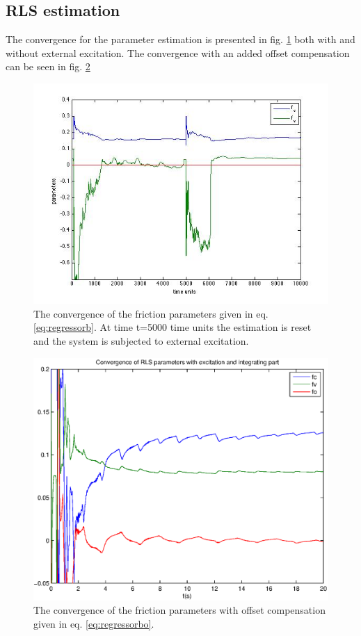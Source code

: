 \documentclass[10pt,a4paper]{article}
\begin{document}
\subsection{RLS estimation}
The convergence for the parameter estimation is presented in fig. \ref{fig:rlsconv} both with and without external excitation. The convergence with an added offset compensation can be seen in fig. \ref{fig:rlsconvoffset}
\begin{figure}[H]
\centering
\includegraphics[width=1\textwidth]{plots/rlsconvergence.jpg}
\caption{The convergence of the friction parameters given in eq. \ref{eq:regressorb}. At time t=5000 time units the estimation is reset and the system is subjected to external excitation.}
\label{fig:rlsconv}
\end{figure}
\begin{figure}[H]
\centering
\includegraphics[width=1\textwidth]{plots/rlsconvoffset.eps}
\caption{The convergence of the friction parameters with offset compensation given in eq. \ref{eq:regressorbo}.}
\label{fig:rlsconvoffset}
\end{figure}
\end{document}

